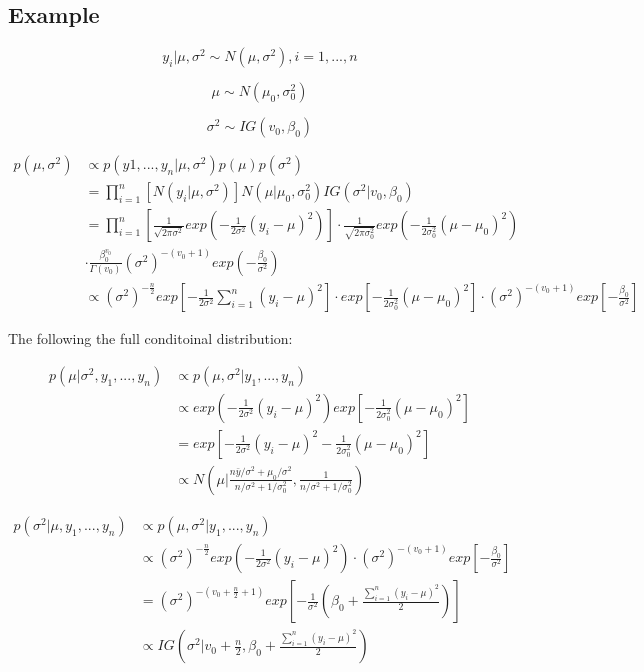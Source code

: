 \documentclass[]{book}
\begin{document}
\subsection{Example}\label{example}

\[y_i|\mu, \sigma^2 \sim N(\mu, \sigma^2),i = 1, ...,n\]

\[\mu \sim N(\mu_0,\sigma_0^2)\]

\[\sigma^2 \sim IG(v_0,\beta_0)\]

\[\begin{aligned} p(\mu, \sigma^2) &\propto p(y1,...,y_n| \mu, \sigma^2)p(\mu)p(\sigma^2) \\ &=\prod_{i=1}^n[N(y_i|\mu,\sigma^2)]N(\mu|\mu_0,\sigma_0^2)IG(\sigma^2|v_0,\beta_0)\\ &= \prod_{i=1}^n [\frac{1}{\sqrt{2\pi \sigma^2}} exp(-\frac{1}{2\sigma^2}(y_i-\mu)^2)] \cdot \frac{1}{\sqrt{2\pi \sigma_0^2}} exp(-\frac{1}{2\sigma_0^2}(\mu-\mu_0)^2) \\ &\cdot \frac{\beta_0^{v_0}}{\Gamma(v_0)}(\sigma^2)^{-(v_0+1)}exp(-\frac{\beta_0}{\sigma^2}) \\ &\propto (\sigma^2)^{-\frac{n}{2}}exp[-\frac{1}{2\sigma^2} \sum_{i=1}^n(y_i-\mu)^2] \cdot exp[-\frac{1}{2\sigma_0^2}(\mu-\mu_0)^2] \cdot (\sigma^2)^{-(v_0+1)}exp[-\frac{\beta_0}{\sigma^2}] \end{aligned}\]

The following the full conditoinal distribution:

\[\begin{aligned} p(\mu| \sigma^2, y_1,...,y_n) &\propto p(\mu,\sigma^2 | y_1,...,y_n)\\ &\propto  exp(-\frac{1}{2\sigma^2}(y_i-\mu)^2) exp[-\frac{1}{2\sigma_0^2}(\mu-\mu_0)^2] \\ &=exp[-\frac{1}{2\sigma^2}(y_i-\mu)^2-\frac{1}{2\sigma_0^2}(\mu-\mu_0)^2] \\ &\propto N(\mu |\frac{n\bar{y}/\sigma^2+\mu_0/\sigma^2}{n/\sigma^2+1/\sigma_0^2},\frac{1}{n/\sigma^2+1/\sigma_0^2})\end{aligned}\]

\[\begin{aligned} p(\sigma^2| \mu, y_1,...,y_n) &\propto p(\mu,\sigma^2 | y_1,...,y_n)\\ &\propto  (\sigma^2)^{-\frac{n}{2}} exp(-\frac{1}{2\sigma^2}(y_i-\mu)^2) \cdot (\sigma^2)^{-(v_0+1)}exp[-\frac{\beta_0}{\sigma^2}]\\ &= (\sigma^2)^{-(v_0+\frac{n}{2}+1)}exp[-\frac{1}{\sigma^2}(\beta_0+\frac{\sum_{i=1}^n(y_i-\mu)^2}{2})] \\ &\propto IG(\sigma^2|v_0+\frac{n}{2},\beta_0+\frac{\sum_{i=1}^n(y_i-\mu)^2}{2})\end{aligned}\]
\end{document}
